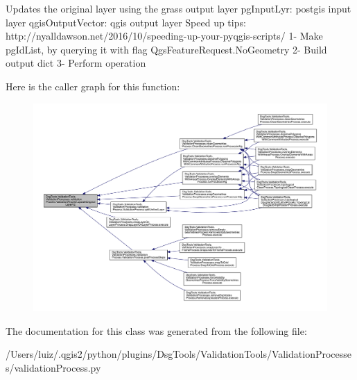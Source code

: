 \begin{DoxyVerb}Updates the original layer using the grass output layer
pgInputLyr: postgis input layer
qgisOutputVector: qgis output layer
Speed up tips: http://nyalldawson.net/2016/10/speeding-up-your-pyqgis-scripts/
1- Make pgIdList, by querying it with flag QgsFeatureRequest.NoGeometry
2- Build output dict
3- Perform operation
\end{DoxyVerb}
 Here is the caller graph for this function\+:
\nopagebreak
\begin{figure}[H]
\begin{center}
\leavevmode
\includegraphics[width=350pt]{class_dsg_tools_1_1_validation_tools_1_1_validation_processes_1_1validation_process_1_1_validation_process_a7b4cd068aedb219df5f71ab7ed6cb3b5_icgraph}
\end{center}
\end{figure}


The documentation for this class was generated from the following file\+:\begin{DoxyCompactItemize}
\item 
/\+Users/luiz/.\+qgis2/python/plugins/\+Dsg\+Tools/\+Validation\+Tools/\+Validation\+Processes/validation\+Process.\+py\end{DoxyCompactItemize}
